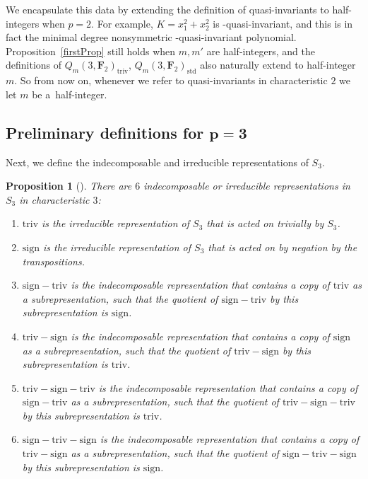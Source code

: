 \documentclass[pdftex]{sigma}
\newtheorem{Proposition}[Theorem]{Proposition}
\theoremstyle{definition}
\numberwithin{equation}{section}
\newcommand{\triv}{\mathrm{triv}}
\newcommand{\std}{\mathrm{std}}
\newcommand{\sign}{\mathrm{sign}}
\newcommand{\trix}{\mathrm{triv-sign-triv}}
\newcommand{\six}{\mathrm{sign-triv-sign}}
\newcommand{\siv}{\mathrm{sign-triv}}
\newcommand{\tign}{\mathrm{triv-sign}}
\begin{document}
We encapsulate this data by extending the definition of quasi-invariants to half-integers when ${p=2}$. For example, $K=x_1^2+x_2^2$ is -quasi-invariant, and this is in fact the minimal degree nonsymmetric -quasi-invariant polynomial. Proposition~\ref{firstProp} still holds when $m,m'$ are half-integers, and the definitions of $Q_m(3,\mathbf{F}_2)_\triv$, $Q_m(3,\mathbf{F}_2)_\std$ also naturally extend to half-integer~$m$. So from now on, whenever we refer to quasi-invariants in characteristic $2$ we let $m$ be a~half-integer.

\subsection[Preliminary definitions for p=3]{Preliminary definitions for $\boldsymbol{p=3}$}

Next, we define the indecomposable and irreducible representations of $S_3$.

\begin{Proposition}[\cite{Alperin_1986}]
 There are $6$ indecomposable or irreducible representations in $S_3$ in characteristic $3$:
 \begin{enumerate}\itemsep=0pt
 \item[$1$.] $\triv$ is the irreducible representation of $S_3$ that is acted on trivially by $S_3$.
 \item[$2$.] $\sign$ is the irreducible representation of $S_3$ that is acted on by negation by the transpositions.
 \item[$3$.] $\siv$ is the indecomposable representation that contains a copy of $\triv$ as a subrepresentation, such that the quotient of $\siv$ by this subrepresentation is $\sign$.
 \item[$4$.] $\tign$ is the indecomposable representation that contains a copy of $\sign$ as a subrepresentation, such that the quotient of $\tign$ by this subrepresentation is $\triv$.
 \item[$5$.] $\trix$ is the indecomposable representation that contains a copy of $\siv$ as a subrepresentation, such that the quotient of $\trix$ by this subrepresentation is $\triv$.
 \item[$6$.] $\six$ is the indecomposable representation that contains a copy of $\tign$ as a subrepresentation, such that the quotient of $\six$ by this subrepresentation is $\sign$.
 \end{enumerate}
\end{Proposition}
\end{document}
